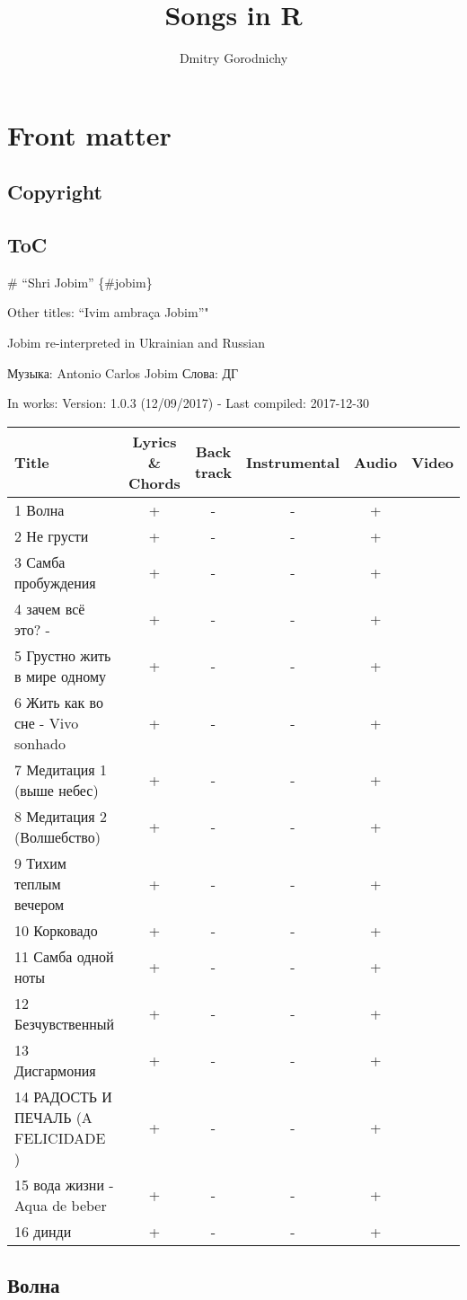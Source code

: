 \documentclass[]{book}
\title{Songs in R}
\author{Dmitry Gorodnichy}
\date{}
\begin{document}
\maketitle

{
\setcounter{tocdepth}{1}
\tableofcontents
}
\chapter*{Front matter}\label{front-matter}

\section{Copyright}\label{copyright}

\section{ToC}\label{toc}

 \# ``Shri Jobim'' \{\#jobim\}

Other titles: ``Ivim ambraça Jobim''"

Jobim re-interpreted in Ukrainian and Russian

Музыка: Antonio Carlos Jobim Слова: ДГ

In works: Version: 1.0.3 (12/09/2017) - Last compiled: 2017-12-30

\begin{longtable}[]{@{}lccccc@{}}
\toprule
Title & Lyrics \& Chords & Back track & Instrumental & Audio &
Video\tabularnewline
\midrule
\endhead
1 Волна & + & - & - & + &\tabularnewline
2 Не грусти & + & - & - & + &\tabularnewline
3 Самба пробуждения & + & - & - & + &\tabularnewline
4 зачем всё это? - & + & - & - & + &\tabularnewline
5 Грустно жить в мире одному & + & - & - & + &\tabularnewline
6 Жить как во сне - Vivo sonhado & + & - & - & + &\tabularnewline
7 Медитация 1 (выше небес) & + & - & - & + &\tabularnewline
8 Медитация 2 (Волшебство) & + & - & - & + &\tabularnewline
9 Тихим теплым вечером & + & - & - & + &\tabularnewline
10 Корковадо & + & - & - & + &\tabularnewline
11 Самба одной ноты & + & - & - & + &\tabularnewline
12 Безчувственный & + & - & - & + &\tabularnewline
13 Дисгармония & + & - & - & + &\tabularnewline
14 РАДОСТЬ И ПЕЧАЛЬ (A FELICIDADE ) & + & - & - & + &\tabularnewline
15 вода жизни - Aqua de beber & + & - & - & + &\tabularnewline
16 динди & + & - & - & + &\tabularnewline
\bottomrule
\end{longtable}

\section{Волна}\label{wave}
\end{document}

